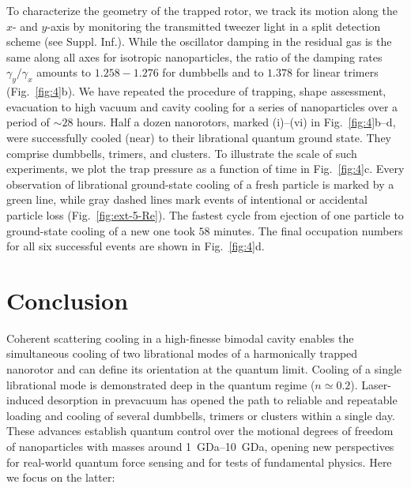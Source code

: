 \documentclass[reprint, amsmath, amssymb, superscriptaddress,showkeys,aps,pra]{revtex4-2}
\begin{document}
To characterize the geometry of the trapped rotor, we track its motion along the $x$- and $y$-axis by monitoring the transmitted tweezer light in a split detection scheme (see Suppl. Inf.). While the oscillator damping in the residual gas is the same along all axes for isotropic nanoparticles, the ratio of the damping rates $\gamma_y/\gamma_x$ amounts to $1.258-1.276$ for dumbbells and to $1.378$ for linear trimers \cite{ahn_optically_2018} (Fig.~\ref{fig:4}b). We have repeated the procedure of trapping, shape assessment, evacuation to high vacuum  and cavity cooling for a series of nanoparticles over a period of $\sim 28$ hours. Half a dozen nanorotors, marked (i)--(vi) in Fig.~\ref{fig:4}b--d, were successfully cooled (near) to their librational quantum ground state. They comprise dumbbells, trimers, and clusters.
To illustrate the scale of such experiments, we plot the trap pressure as a function of time in Fig.~\ref{fig:4}c. Every observation of librational ground-state cooling of a fresh particle is marked by a green line, while gray dashed lines mark events of intentional or accidental particle loss (Fig.~\ref{fig:ext-5-Re}). The fastest cycle from ejection of one particle to ground-state cooling of a new one took $58$ minutes. The final occupation numbers for all six successful events are shown in Fig.~\ref{fig:4}d. 

\section{Conclusion}

Coherent scattering cooling in a high-finesse bimodal cavity enables the simultaneous cooling of two librational modes of a harmonically trapped nanorotor and can define its orientation at the quantum limit. Cooling of a single librational mode is demonstrated  deep in the quantum regime ($n\simeq 0.2$). Laser-induced desorption in prevacuum has opened the path to reliable and repeatable loading and cooling of  several  dumbbells, trimers or clusters within a single day. These advances establish  quantum control over the motional degrees of freedom of nanoparticles with masses around \qtyrange{1}{10}{GDa}, opening new perspectives for real-world quantum force sensing and for tests of fundamental physics. Here we focus on the latter: 
\end{document}
